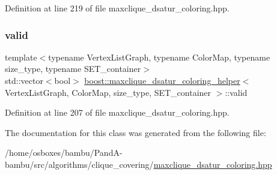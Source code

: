 Definition at line 219 of file maxclique\+\_\+dsatur\+\_\+coloring.\+hpp.

\mbox{\label{classboost_1_1maxclique__dsatur__coloring__helper_a3efdfe934f0dd18f941dac27c5481b05}} 
\subsubsection{\texorpdfstring{valid}{valid}}
{\footnotesize\ttfamily template$<$typename Vertex\+List\+Graph, typename Color\+Map, typename size\+\_\+type, typename S\+E\+T\+\_\+container$>$ \\
std\+::vector$<$bool$>$ \hyperlink{classboost_1_1maxclique__dsatur__coloring__helper}{boost\+::maxclique\+\_\+dsatur\+\_\+coloring\+\_\+helper}$<$ Vertex\+List\+Graph, Color\+Map, size\+\_\+type, S\+E\+T\+\_\+container $>$\+::valid\hspace{0.3cm}{\ttfamily [private]}}



Definition at line 207 of file maxclique\+\_\+dsatur\+\_\+coloring.\+hpp.



The documentation for this class was generated from the following file\+:\begin{DoxyCompactItemize}
\item 
/home/osboxes/bambu/\+Pand\+A-\/bambu/src/algorithms/clique\+\_\+covering/\hyperlink{maxclique__dsatur__coloring_8hpp}{maxclique\+\_\+dsatur\+\_\+coloring.\+hpp}\end{DoxyCompactItemize}
